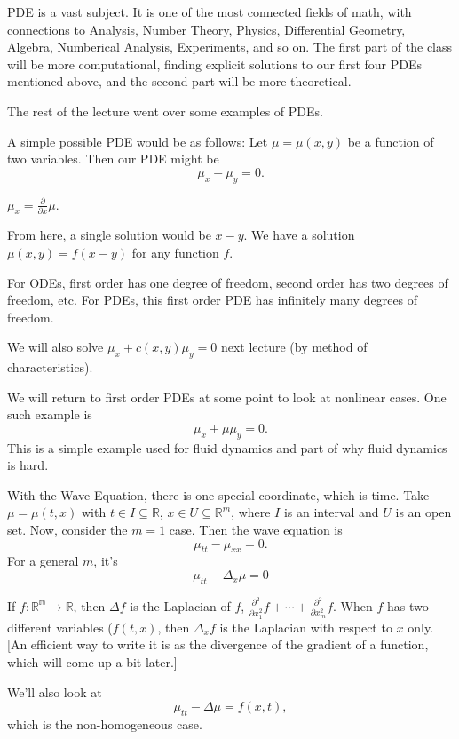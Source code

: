 PDE is a vast subject. It is one of the most connected fields of math, with connections to Analysis, Number Theory, Physics, Differential Geometry, Algebra, Numberical Analysis, Experiments, and so on. The first part of the class will be more computational, finding explicit solutions to our first four PDEs mentioned above, and the second part will be more theoretical.\pagebreak

The rest of the lecture went over some examples of PDEs.
\begin{example}
	A simple possible PDE would be as follows: Let \( \mu = \mu(x, y) \) be a function of two variables. Then our PDE might be \[ \mu_{x} + \mu_{y} = 0. \]
		\begin{remark}
			\( \mu_{x} = \frac{\partial}{\partial x} \mu \).
		\end{remark}
		From here, a single solution would be \( x - y \). We have a solution \( \mu(x, y) = f(x - y) \) for any function \( f \).
		\begin{remark}
		For ODEs, first order has one degree of freedom, second order has two degrees of freedom, etc. For PDEs, this first order PDE has infinitely many degrees of freedom.
		\end{remark}
		We will also solve \( \mu_{x} + c(x, y) \mu_{y} = 0 \) next lecture (by method of characteristics).
\end{example}

\begin{example}
	We will return to first order PDEs at some point to look at nonlinear cases. One such example is 
	\[ \mu_{x} + \mu \mu_{y} = 0. \]
	This is a simple example used for fluid dynamics and part of why fluid dynamics is hard.
\end{example}
\begin{example}
		With the Wave Equation, there is one special coordinate, which is time.
		Take \( \mu = \mu(t, x) \) with \( t \in I \subseteq \mathbb{R} \), \( x \in U \subseteq \mathbb{R}^{m} \), where \( I \) is an interval and \( U \) is an open set. Now, consider the \( m = 1 \) case. Then the wave equation is
		\[ \mu_{tt} - \mu_{x x} = 0. \]
		For a general \( m \), it's
		\[ \mu_{tt} - \Delta_{x} \mu = 0  \]
		\begin{remark}
			If \( f : \mathbb{R^{m}} \to \mathbb{R} \), then \( \Delta f \) is the Laplacian of \( f \), \( \frac{\partial^{2}}{\partial x_{1}^{2}} f + \cdots + \frac{\partial^{2}}{\partial x_{m}^{2}} f \). When \( f \) has two different variables (\( f(t, x) \), then \( \Delta_{x} f \) is the Laplacian with respect to \( x \) only. [An efficient way to write it is as the divergence of the gradient of a function, which will come up a bit later.]
		\end{remark}
		We'll also look at
		\[ \mu_{tt} - \Delta \mu = f(x, t), \]
		which is the non-homogeneous case.
\end{example}

